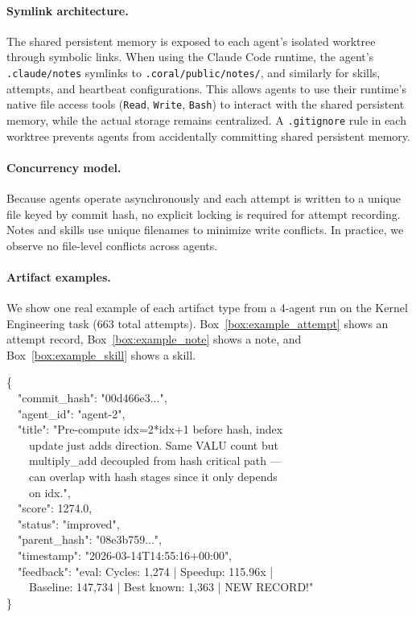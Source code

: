 \paragraph{Symlink architecture.} The shared persistent memory is exposed to each agent's isolated worktree through symbolic links. When using the Claude Code runtime, the agent's \texttt{.claude/notes} symlinks to \texttt{.coral/public/notes/}, and similarly for skills, attempts, and heartbeat configurations. This allows agents to use their runtime's native file access tools (\texttt{Read}, \texttt{Write}, \texttt{Bash}) to interact with the shared persistent memory, while the actual storage remains centralized. A \texttt{.gitignore} rule in each worktree prevents agents from accidentally committing shared persistent memory.

\paragraph{Concurrency model.} Because agents operate asynchronously and each attempt is written to a unique file keyed by commit hash, no explicit locking is required for attempt recording. Notes and skills use unique filenames to minimize write conflicts. In practice, we observe no file-level conflicts across agents.

\paragraph{Artifact examples.} We show one real example of each artifact type from a 4-agent run on the Kernel Engineering task (663 total attempts). Box~\ref{box:example_attempt} shows an attempt record, Box~\ref{box:example_note} shows a note, and Box~\ref{box:example_skill} shows a skill.

\begin{promptbox}
\label{box:example_attempt}
\ttfamily\scriptsize
\{\\
~~"commit\_hash": "00d466e3...",\\
~~"agent\_id": "agent-2",\\
~~"title": "Pre-compute idx=2*idx+1 before hash, index\\
~~~~update just adds direction. Same VALU count but\\
~~~~multiply\_add decoupled from hash critical path ---\\
~~~~can overlap with hash stages since it only depends\\
~~~~on idx.",\\
~~"score": 1274.0,\\
~~"status": "improved",\\
~~"parent\_hash": "08e3b759...",\\
~~"timestamp": "2026-03-14T14:55:16+00:00",\\
~~"feedback": "eval: Cycles: 1,274 | Speedup: 115.96x |\\
~~~~Baseline: 147,734 | Best known: 1,363 | NEW RECORD!"\\
\}
\end{promptbox}

